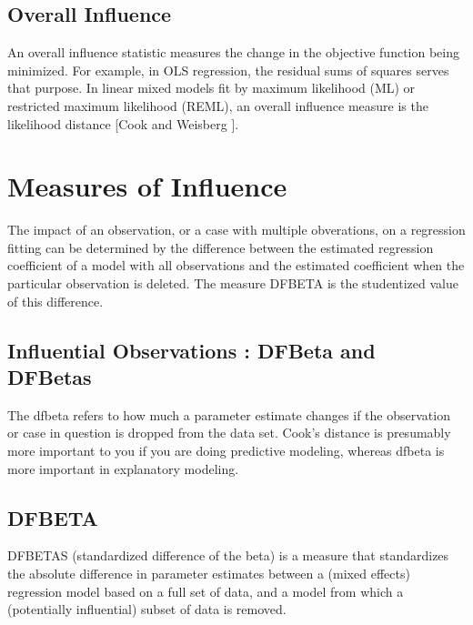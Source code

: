 \documentclass[Main.tex]{subfiles}
\begin{document}
	
	
	\subsection{Overall Influence}
	An overall influence statistic measures the change in the objective function being minimized. For example, in
	OLS regression, the residual sums of squares serves that purpose. In linear mixed models fit by
	 maximum likelihood (ML) or  restricted maximum likelihood (REML), an overall influence measure is the  likelihood distance [Cook and Weisberg ].
	
	
	\section{Measures of Influence} %
	
	The impact of an observation, or a case with multiple obverations, on a regression fitting can be determined by the difference between the estimated regression coefficient of a model with all observations and the estimated coefficient when the particular observation is deleted. The measure DFBETA is the studentized value of this difference.
	
	
	
	\subsection{Influential Observations : DFBeta and DFBetas}
	The dfbeta refers to how much a parameter estimate changes if the observation or case in question is dropped from the data set.  Cook's distance is presumably more important to you if you are doing predictive modeling, whereas dfbeta is more important in explanatory modeling.
	\subsection{DFBETA} %
	DFBETAS (standardized difference of the beta) is a measure that standardizes the absolute difference in parameter estimates between a (mixed effects) regression model based on a full set of data, and a model from which a (potentially influential) subset of data is removed.
\end{document}

